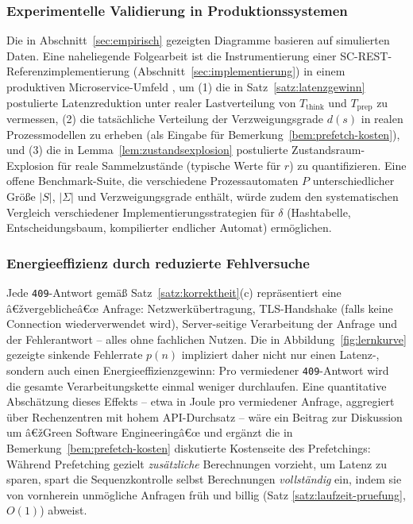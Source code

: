 ﻿\documentclass[a4paper,12pt]{article}
\theoremstyle{definition}
\begin{document}
\subsubsection{Experimentelle Validierung in Produktionssystemen}

Die in Abschnitt~\ref{sec:empirisch} gezeigten Diagramme basieren auf simulierten Daten.
Eine naheliegende Folgearbeit ist die Instrumentierung einer SC-REST-Referenzimplementierung
(Abschnitt~\ref{sec:implementierung}) in einem produktiven Microservice-Umfeld
\cite{newman2021}, um (1) die in Satz~\ref{satz:latenzgewinn} postulierte
Latenzreduktion unter realer Lastverteilung von $T_{\mathrm{think}}$ und
$T_{\mathrm{prep}}$ zu vermessen, (2) die tatsächliche Verteilung der
Verzweigungsgrade $d(s)$ in realen Prozessmodellen zu erheben (als Eingabe für
Bemerkung~\ref{bem:prefetch-kosten}), und (3) die in Lemma~\ref{lem:zustandsexplosion}
postulierte Zustandsraum-Explosion für reale Sammelzustände (typische Werte für $r$) zu
quantifizieren. Eine offene Benchmark-Suite, die verschiedene Prozessautomaten
$P$ unterschiedlicher Größe $|S|$, $|\Sigma|$ und Verzweigungsgrade enthält, würde
zudem den systematischen Vergleich verschiedener Implementierungsstrategien für $\delta$
(Hashtabelle, Entscheidungsbaum, kompilierter endlicher Automat) ermöglichen.

\subsubsection{Energieeffizienz durch reduzierte Fehlversuche}

Jede \texttt{409}-Antwort gemäß Satz~\ref{satz:korrektheit}(c) repräsentiert eine
â€žvergeblicheâ€œ Anfrage: Netzwerkübertragung, TLS-Handshake (falls keine Connection
wiederverwendet wird), Server-seitige Verarbeitung der Anfrage und der Fehlerantwort --
alles ohne fachlichen Nutzen. Die in Abbildung~\ref{fig:lernkurve} gezeigte sinkende
Fehlerrate $p(n)$ impliziert daher nicht nur einen Latenz-, sondern auch einen
Energieeffizienzgewinn: Pro vermiedener \texttt{409}-Antwort wird die gesamte
Verarbeitungskette einmal weniger durchlaufen. Eine quantitative Abschätzung dieses
Effekts -- etwa in Joule pro vermiedener Anfrage, aggregiert über Rechenzentren mit
hohem API-Durchsatz -- wäre ein Beitrag zur Diskussion um â€žGreen Software Engineeringâ€œ und
ergänzt die in Bemerkung~\ref{bem:prefetch-kosten} diskutierte Kostenseite des
Prefetchings: Während Prefetching gezielt \emph{zusätzliche} Berechnungen vorzieht, um
Latenz zu sparen, spart die Sequenzkontrolle selbst Berechnungen \emph{vollständig} ein,
indem sie von vornherein unmögliche Anfragen früh und billig (Satz
\ref{satz:laufzeit-pruefung}, $O(1)$) abweist.
\end{document}
